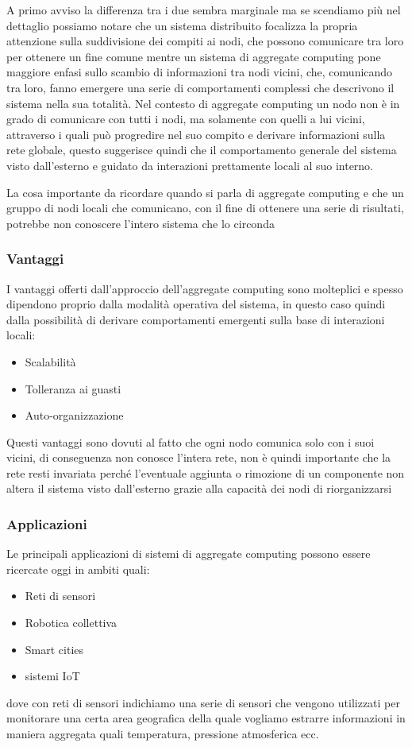 \documentclass[12pt,a4paper,openright,twoside]{book}
\begin{document}
A primo avviso la differenza tra i due sembra marginale ma se scendiamo più nel dettaglio possiamo notare che un sistema distribuito focalizza la propria attenzione sulla suddivisione dei compiti ai nodi, che possono comunicare tra loro per ottenere un fine comune mentre un sistema di aggregate computing pone maggiore enfasi sullo scambio di informazioni tra nodi vicini, che, comunicando tra loro, fanno emergere una serie di comportamenti complessi che descrivono il sistema nella sua totalità.
Nel contesto di aggregate computing un nodo non è in grado di comunicare con tutti i nodi, ma solamente con quelli a lui vicini, attraverso i quali può progredire nel suo compito e derivare informazioni sulla rete globale, questo suggerisce quindi che il comportamento generale del sistema visto dall'esterno e guidato da interazioni prettamente locali al suo interno.

La cosa importante da ricordare quando si parla di aggregate computing e che un gruppo di nodi locali che comunicano, con il fine di ottenere una serie di risultati, potrebbe non conoscere l'intero sistema che lo circonda

\subsubsection{Vantaggi}
I vantaggi offerti dall'approccio dell'aggregate computing sono molteplici e spesso dipendono proprio dalla modalità operativa del sistema, in questo caso quindi dalla possibilità di derivare comportamenti emergenti sulla base di interazioni locali:
\begin{itemize}
	\item Scalabilità
	\item Tolleranza ai guasti
	\item Auto-organizzazione
\end{itemize}
Questi vantaggi sono dovuti al fatto che ogni nodo comunica solo con i suoi vicini, di conseguenza non conosce l'intera rete, non è quindi importante che la rete resti invariata perché l'eventuale aggiunta o rimozione di un componente non altera il sistema visto dall'esterno grazie alla capacità dei nodi di riorganizzarsi

\subsubsection{Applicazioni}
Le principali applicazioni di sistemi di aggregate computing possono essere ricercate oggi in ambiti quali:
\begin{itemize}
	\item Reti di sensori
	\item Robotica collettiva
	\item Smart cities
	\item sistemi IoT
\end{itemize}
dove con reti di sensori indichiamo una serie di sensori che vengono utilizzati per monitorare una certa area geografica della quale vogliamo estrarre informazioni in maniera aggregata quali temperatura, pressione atmosferica ecc.
\end{document}
